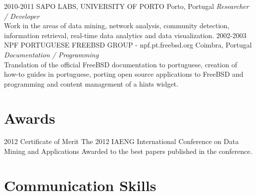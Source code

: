 \documentclass{friggeri-cv}
\begin{document}
\begin{entrylist}
\entry
{2010-2011}
{SAPO LABS, UNIVERSITY OF PORTO}
{Porto, Portugal}
{\emph{Researcher / Developer}\\
Work in the areas of data mining, network analysis, community detection, information retrieval, real-time data analytics and data visualization.}
\entry
{2002-2003}
{NPF PORTUGUESE FREEBSD GROUP - npf.pt.freebsd.org}
{Coimbra, Portugal}
{\emph{Documentation / Programming}\\
Translation of the official FreeBSD documentation to portuguese, creation of how-to guides in portuguese, porting open source applications to FreeBSD and programming and content management of a hints widget.}
\end{entrylist}


\section{Awards}

\begin{entrylist}
\entry
{2012}
{Certificate of Merit}
{The 2012 IAENG International Conference on Data Mining and Applications}
{Awarded to the best papers published in the conference.}
\end{entrylist}

\section{Communication Skills}
\end{document}
